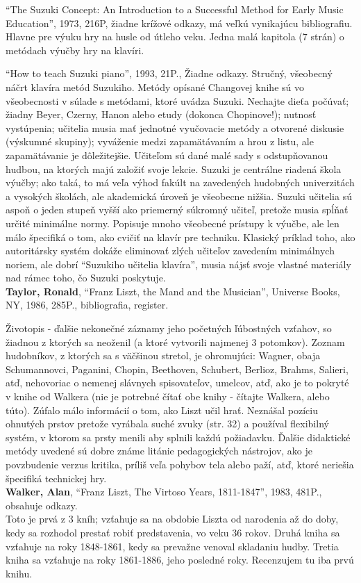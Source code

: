 \documentclass[11pt,a4paper]{book}
\begin{document}
“The Suzuki Concept: An Introduction to a Successful Method for Early Music Education”, 1973, 216P, žiadne krížové odkazy, má veľkú vynikajúcu bibliografiu. Hlavne pre výuku hry na husle od útleho veku. Jedna malá kapitola (7 strán) o metódach výučby hry na klavíri. 

“How to teach Suzuki piano”, 1993, 21P., Žiadne odkazy. Stručný, všeobecný náčrt klavíra metód Suzukiho. Metódy opísané Changovej knihe sú vo všeobecnosti v súlade s metódami, ktoré uvádza Suzuki. Nechajte dieťa počúvať; žiadny Beyer, Czerny, Hanon alebo etudy (dokonca Chopinove!); nutnosť vystúpenia; učitelia musia mať jednotné vyučovacie metódy a otvorené diskusie (výskumné skupiny); vyváženie medzi zapamätávaním a hrou z listu, ale zapamätávanie je dôležitejšie. Učiteľom sú dané malé sady s odstupňovanou hudbou, na ktorých majú založiť svoje lekcie. Suzuki je centrálne riadená škola výučby; ako taká, to má veľa výhod fakúlt na zavedených hudobných univerzitách a vysokých školách, ale akademická úroveň je všeobecne nižšia. Suzuki učitelia sú aspoň o jeden stupeň vyšší ako priemerný súkromný učiteľ, pretože musia spĺňať určité minimálne normy. Popisuje mnoho všeobecné prístupy k výučbe, ale len málo špecifiká o tom, ako cvičiť na klavír pre techniku. Klasický príklad toho, ako autoritársky systém dokáže eliminovať zlých učiteľov zavedením minimálnych noriem, ale dobrí “Suzukiho učitelia klavíra”, musia nájsť svoje vlastné materiály nad rámec toho, čo Suzuki poskytuje.
\medskip\\
\textbf{Taylor, Ronald}, “Franz Liszt, the Mand and the Musician”, Universe Books, NY, 1986, 285P., bibliografia, register. 

Životopis - ďalšie nekonečné záznamy jeho početných ľúbostných vzťahov, so žiadnou z ktorých sa neoženil (a ktoré vytvorili najmenej 3 potomkov). Zoznam hudobníkov, z ktorých sa s väčšinou stretol, je ohromujúci: Wagner, obaja Schumannovci, Paganini, Chopin, Beethoven, Schubert, Berlioz, Brahms, Salieri, atď, nehovoriac o nemenej slávnych spisovateľov, umelcov, atď, ako je to pokryté v knihe od  Walkera (nie je potrebné čítať obe knihy - čítajte Walkera, alebo túto). Zúfalo málo informácií o tom, ako Liszt učil hrať. Neznášal pozíciu ohnutých prstov pretože vyrábala suché zvuky (str. 32) a používal flexibilný systém, v ktorom sa prsty menili aby splnili každú požiadavku. Ďalšie didaktické metódy uvedené sú dobre známe litánie pedagogických nástrojov, ako je povzbudenie verzus kritika, príliš veľa pohybov tela alebo paží, atď, ktoré neriešia špecifiká technickej hry. 
\medskip\\
\textbf{Walker, Alan}, “Franz Liszt, The Virtoso Years, 1811-1847”, 1983, 481P., obsahuje odkazy.\\
Toto je prvá z 3 kníh; vzťahuje sa na obdobie Liszta od narodenia až do doby, kedy sa rozhodol prestať  robiť predstavenia, vo veku 36 rokov. Druhá kniha sa vzťahuje na roky 1848-1861, kedy sa prevažne venoval skladaniu hudby. Tretia kniha sa vzťahuje na roky 1861-1886, jeho posledné roky. Recenzujem tu iba prvú knihu. 
\end{document}
